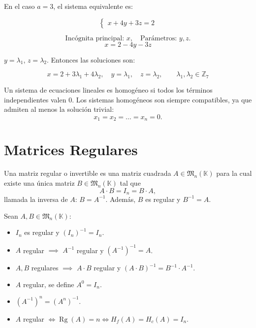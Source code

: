 \documentclass[a4paper,12pt]{article}
\begin{document}
\begin{ejemplo}[title=Ejemplo de sistema dependiente de un parámetro]
En el caso $a=3$, el sistema equivalente es:

\[
\begin{cases}
x + 4y + 3z = 2
\end{cases}
\]

\[
\text{Incógnita principal: } x, \quad \text{Parámetros: } y, z.
\]
\[
x = 2 - 4y - 3z
\]

$y = \lambda_1$, $z = \lambda_2$. Entonces las soluciones son:

\[
\boxed{
x = 2 + 3\lambda_1 + 4\lambda_2, \quad y = \lambda_1, \quad z = \lambda_2, \qquad \lambda_1, \lambda_2 \in \mathbb{Z}_7
}
\]

\end{ejemplo}

\begin{procedimiento}[title=Sistema homogéneo]
Un sistema de ecuaciones lineales es homogéneo si todos los términos independientes valen $0$. Los sistemas homogéneos son siempre compatibles, ya que admiten al menos la solución trivial:
\[
x_1 = x_2 = \dots = x_n = 0.
\]
\end{procedimiento}

\section{Matrices Regulares}

\begin{procedimiento}[title=Matriz Regular]
Una matriz regular o invertible es una matriz cuadrada $A \in \mathfrak{M}_n(\mathbb{K})$ para la cual existe una única matriz $B \in \mathfrak{M}_n(\mathbb{K})$ tal que
\[
A \cdot B = I_n = B \cdot A,
\]
llamada la inversa de $A$: $B = A^{-1}$.
Además, $B$ es regular y $B^{-1} = A$.
\end{procedimiento}

\begin{procedimiento}[title=Propiedades de matrices regulares]
Sean $A, B \in \mathfrak{M}_n(\mathbb{K})$:
\begin{itemize}
    \item $I_n$ es regular y $(I_n)^{-1} = I_n$.
    \item $A$ regular $\implies$ $A^{-1}$ regular y $(A^{-1})^{-1} = A$.
    \item $A, B$ regulares $\implies$ $A \cdot B$ regular y $(A \cdot B)^{-1} = B^{-1} \cdot A^{-1}$.
    \item $A$ regular, se define $A^0 = I_n$.
    \item $(A^{-1})^n = (A^n)^{-1}$.
    \item $A$ regular $\iff \operatorname{Rg}(A) = n \iff H_f(A) = H_c(A) = I_n$.
\end{itemize}
\end{procedimiento}
\end{document}
